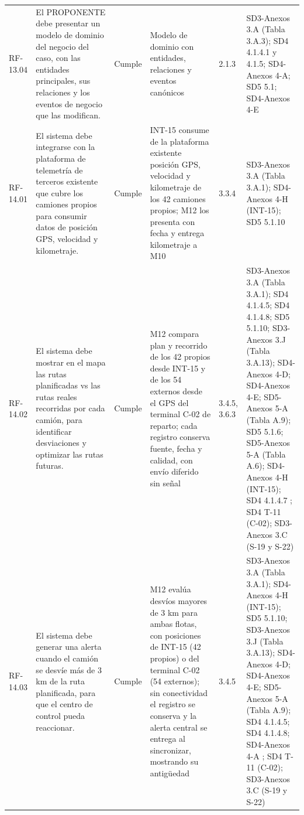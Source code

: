 \documentclass[carta,firma,final]{lafrox}
\begin{document}
\begin{landscape}
{\begin{longtable}{@{}F{0.070} F{0.255} F{0.075} F{0.280} F{0.090} F{0.230}@{}}
  RF-13.04 & El PROPONENTE debe presentar un modelo de dominio del negocio del caso, con las entidades principales, sus relaciones y los eventos de negocio que las modifican. & Cumple & Modelo de dominio con entidades, relaciones y eventos canónicos & 2.1.3 & SD3-Anexos 3.A (Tabla 3.A.3); SD4 4.1.4.1 y 4.1.5; SD4-Anexos 4-A; SD5 5.1; SD4-Anexos 4-E \\
  RF-14.01 & El sistema debe integrarse con la plataforma de telemetría de terceros existente que cubre los camiones propios para consumir datos de posición GPS, velocidad y kilometraje. & Cumple & INT-15 consume de la plataforma existente posición GPS, velocidad y kilometraje de los 42 camiones propios; M12 los presenta con fecha y entrega kilometraje a M10 & 3.3.4 & SD3-Anexos 3.A (Tabla 3.A.1); SD4-Anexos 4-H (INT-15); SD5 5.1.10 \\
  RF-14.02 & El sistema debe mostrar en el mapa las rutas planificadas vs las rutas reales recorridas por cada camión, para identificar desviaciones y optimizar las rutas futuras. & Cumple & M12 compara plan y recorrido de los 42 propios desde INT-15 y de los 54 externos desde el GPS del terminal C-02 de reparto; cada registro conserva fuente, fecha y calidad, con envío diferido sin señal & 3.4.5, 3.6.3 & SD3-Anexos 3.A (Tabla 3.A.1); SD4 4.1.4.5; SD4 4.1.4.8; SD5 5.1.10; SD3-Anexos 3.J (Tabla 3.A.13); SD4-Anexos 4-D; SD4-Anexos 4-E; SD5-Anexos 5-A (Tabla A.9); SD5 5.1.6; SD5-Anexos 5-A (Tabla A.6); SD4-Anexos 4-H (INT-15); SD4 4.1.4.7 ; SD4 T-11 (C-02); SD3-Anexos 3.C (S-19 y S-22) \\
  RF-14.03 & El sistema debe generar una alerta cuando el camión se desvíe más de 3 km de la ruta planificada, para que el centro de control pueda reaccionar. & Cumple & M12 evalúa desvíos mayores de 3 km para ambas flotas, con posiciones de INT-15 (42 propios) o del terminal C-02 (54 externos); sin conectividad el registro se conserva y la alerta central se entrega al sincronizar, mostrando su antigüedad & 3.4.5 & SD3-Anexos 3.A (Tabla 3.A.1); SD4-Anexos 4-H (INT-15); SD5 5.1.10; SD3-Anexos 3.J (Tabla 3.A.13); SD4-Anexos 4-D; SD4-Anexos 4-E; SD5-Anexos 5-A (Tabla A.9); SD4 4.1.4.5; SD4 4.1.4.8; SD4-Anexos 4-A ; SD4 T-11 (C-02); SD3-Anexos 3.C (S-19 y S-22) \\

\end{longtable}}
\end{landscape}
\end{document}
